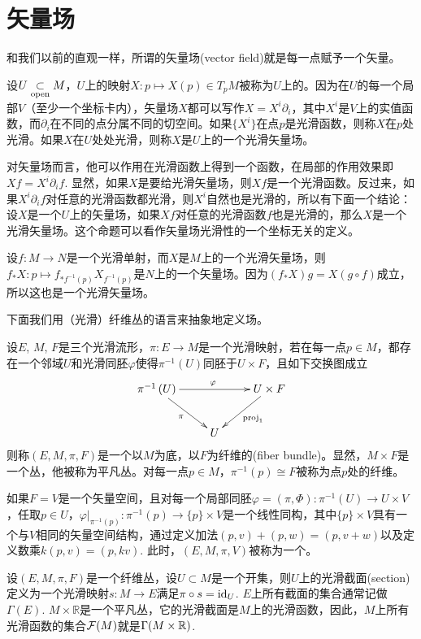 \section{矢量场}
和我们以前的直观一样，所谓的矢量场(vector field)就是每一点赋予一个矢量。

\para 设$U\underset{\mathrm{open}}{\subset} M$，$U$上的映射$X:p\mapsto X(p)\in T_pM$被称为$U$上的。因为在$U$的每一个局部$V$（至少一个坐标卡内），矢量场$X$都可以写作$X=X^i\partial_i$，其中$X^i$是$V$上的实值函数，而$\partial_i$在不同的点分属不同的切空间。如果$\{X^i\}$在点$p$是光滑函数，则称$X$在$p$处光滑。如果$X$在$U$处处光滑，则称$X$是$U$上的一个光滑矢量场。

对矢量场而言，他可以作用在光滑函数上得到一个函数，在局部的作用效果即$Xf=X^i\partial_if$. 显然，如果$X$是要给光滑矢量场，则$Xf$是一个光滑函数。反过来，如果$X^i\partial_if$对任意的光滑函数都光滑，则$X^i$自然也是光滑的，所以有下面一个结论：设$X$是一个$U$上的矢量场，如果$Xf$对任意的光滑函数$f$也是光滑的，那么$X$是一个光滑矢量场。这个命题可以看作矢量场光滑性的一个坐标无关的定义。

\para 设$f:M\to N$是一个光滑单射，而$X$是$M$上的一个光滑矢量场，则$f_*X:p\mapsto f_{*f^{-1}(p)}X_{f^{-1}(p)}$是$N$上的一个矢量场。因为$(f_*X)g=X(g\circ f)$成立，所以这也是一个光滑矢量场。

下面我们用（光滑）纤维丛的语言来抽象地定义场。

\para \label{bundle} 设$E$, $M$, $F$是三个光滑流形，$\pi:E\to M$是一个光滑映射，若在每一点$p\in M$，都存在一个邻域$U$和光滑同胚$\varphi$使得$\pi^{-1}(U)$同胚于$U \times F$，且如下交换图成立
\[
	\xymatrix{
		\pi^{-1}\left(U\right)\ar[rr]^\varphi \ar[dr]_\pi&&U\times F \ar[dl]^{\mathrm{proj}_1}\\
		&U&
		}
\]
则称$(E, M, \pi, F)$是一个以$M$为底，以$F$为纤维的(fiber bundle)。显然，$M\times F$是一个丛，他被称为平凡丛。对每一点$p\in M$，$\pi^{-1}(p)\cong F$被称为点$p$处的纤维。

如果$F=V$是一个矢量空间，且对每一个局部同胚$\varphi=(\pi,\Phi):\pi^{-1}(U)\to U\times V$，任取$p\in U$，$\varphi|_{\pi^{-1}(p)}:\pi^{-1}(p)\to \{p\}\times V$是一个线性同构，其中$\{p\}\times V$具有一个与$V$相同的矢量空间结构，通过定义加法$(p,v)+(p,w)=(p,v+w)$以及定义数乘$k(p,v)=(p,kv)$. 此时，$(E, M, \pi, V)$被称为一个。

\para 设$(E, M, \pi, F)$是一个纤维丛，设$U\subset M$是一个开集，则$U$上的光滑截面(section)定义为一个光滑映射$s:M\to E$满足$\pi\circ s=\operatorname{id}_U$. $E$上所有截面的集合通常记做$\Gamma(E)$. $M\times \mathbb{R}$是一个平凡丛，它的光滑截面是$M$上的光滑函数，因此，$M$上所有光滑函数的集合$\mathcal{F}(M)$就是$\Gamma(M\times \mathbb{R})$.

